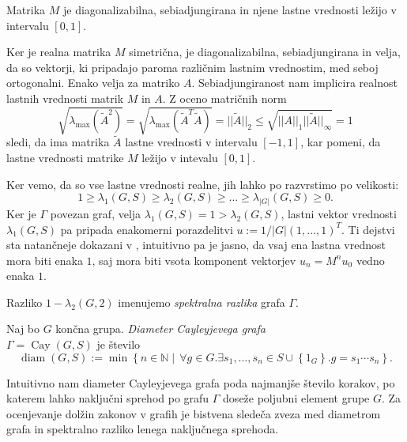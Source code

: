 \begin{lema}
\label{lem_M_je_sebiadjungirana}
Matrika $M$ je diagonalizabilna, sebiadjungirana in njene lastne vrednosti ležijo v intervalu $[0, 1]$.
\end{lema}
\begin{dokaz}
Ker je realna matrika $M$ simetrična, je diagonalizabilna, sebiadjungirana in velja, da so vektorji, ki pripadajo paroma različnim lastnim vrednostim, med seboj ortogonalni. Enako velja za matriko $A$. Sebiadjungiranost nam implicira realnost lastnih vrednosti matrik $M$ in $A$.
Z oceno matričnih norm \begin{equation*}
    \sqrt{ \lambda_{\max} \left(\tilde{A}^2\right)} = \sqrt{\lambda_{\max} \left(\tilde{A}^{T} \tilde{A} \right)}  = \lvert\lvert \tilde{A} \rvert\rvert_2 \le \sqrt{\lvert\lvert A \rvert\rvert_1 \lvert\lvert \tilde{A} \rvert\rvert_{\infty}} = 1 
\end{equation*}  
sledi, da ima matrika $\tilde{A}$ lastne vrednosti v intervalu $[-1 ,1]$, kar pomeni, da lastne vrednosti matrike $M$ ležijo v intevalu $[0, 1]$. 
\end{dokaz}

Ker vemo, da so vse lastne vrednosti realne, jih lahko po razvrstimo po velikosti: 
\begin{equation*}
1 \ge \lambda_1(G, S) \ge \lambda_2(G, S) \ge \ldots \ge \lambda_{\lvert G \rvert }(G, S) \ge 0.  
\end{equation*}  
Ker je $\Gamma$ povezan graf, velja $\lambda_1(G, S) = 1 > \lambda_2(G, S)$, lastni vektor vrednosti $\lambda_1(G, S)$ pa pripada enakomerni porazdelitvi $u := 1/ \lvert G \rvert (1, \ldots, 1)^T$. Ti dejstvi sta natančneje dokazani v \cite{Milanez_2022},
intuitivno pa je jasno, da vsaj ena lastna vrednost mora biti enaka $1$, saj mora biti vsota komponent vektorjev $u_n = M^n u_0$ vedno enaka $1$.

Razliko $1 - \lambda_2(G, 2)$ imenujemo \emph{spektralna razlika} grafa $\Gamma$. 

\begin{definicija}
\label{def_diameter_cayleyjevega_grafa}
Naj bo $G$ končna grupa.
\emph{Diameter Cayleyjevega grafa} \\ $\Gamma = \operatorname{Cay}(G, S)$ je število \begin{equation*}
    \operatorname{diam}(G, S) := \min \left\{ n \in \mathbb{N}  \middle|\, \forall g \in G. \exists s_1, \ldots , s_n \in S \cup \left\{ 1_G \right\} . g = s_1 \cdots s_n \right\}.
\end{equation*}  
\end{definicija}
Intuitivno nam diameter Cayleyjevega grafa poda najmanjše število korakov, po katerem lahko naključni sprehod po grafu $\Gamma$ doseže poljubni element grupe $G$.
Za ocenjevanje dolžin zakonov v grafih je bistvena sledeča zveza med diametrom grafa in spektralno razliko lenega naključnega sprehoda.

